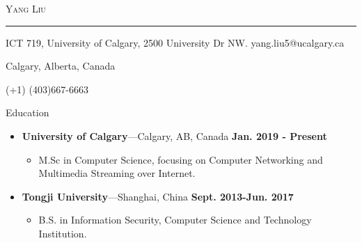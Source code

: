\documentclass[10pt,oneside]{article}
\newcommand{\bigname}[1]{
	\begin{center}\fontfamily{phv}\selectfont\Huge\scshape#1\end{center}
}
\newenvironment{ressection}[1]{
	\vspace{4pt}
	{\fontfamily{phv}\selectfont\Large#1}
	\begin{itemize}
	\vspace{3pt}
}{
	\end{itemize}
}
\newcommand{\ressubitem}[1]{
	\vspace{-1pt}
	\item \begin{flushleft} #1 \end{flushleft}
}
\newcommand{\resbigitem}[3]{
	\vspace{-5pt}
	\item
	\textbf{#1}---#2 \
	\textit{#3}
}
\newenvironment{ressubsec}[3]{
	\resbigitem{#1}{#2}{#3}
	\vspace{-2pt}
	\begin{itemize}
}{
	\end{itemize}
}
\begin{document}
 \selectfont

\bigname{Yang Liu}

\vspace{-8pt} \rule{\textwidth}{1pt}

\vspace{-1pt} {ICT 719, University of Calgary, 2500 University Dr NW. \hfill yang.liu5@ucalgary.ca}

\vspace{-1pt} {Calgary, Alberta, Canada}

\vspace{-1pt} {(+1) (403)667-6663}

\vspace{8 pt}

\newcommand{\textsharp}{$\sharp$}

\begin{ressection}{Education}
	\begin{ressubsec}{University of Calgary}{Calgary, AB, Canada \hfill \textbf{Jan. 2019 - Present}}{}
		\ressubitem{M.Sc in Computer Science, focusing on Computer Networking and
			Multimedia Streaming over Internet.}
	\end{ressubsec}
	\begin{ressubsec}{Tongji University}{Shanghai, China \hfill \textbf{Sept. 2013-Jun. 2017}}{}
		\ressubitem{B.S. in Information Security, Computer Science and Technology Institution.}
	\end{ressubsec}
\end{ressection}
\end{document}

